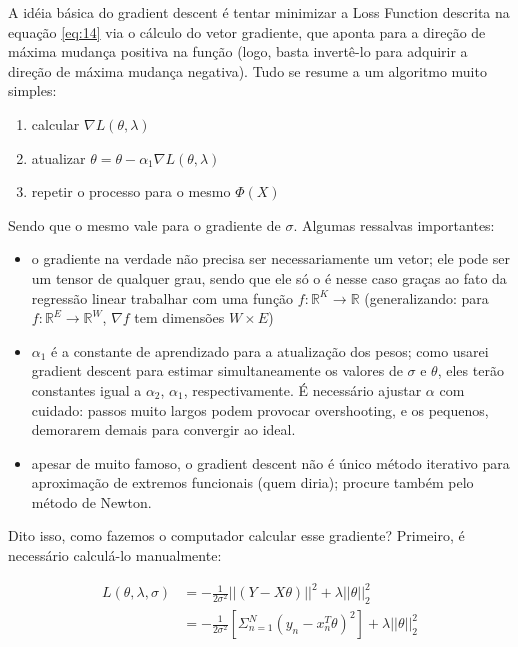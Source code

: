 \documentclass{article}
\begin{document}
A idéia básica do gradient descent é tentar minimizar a 
Loss Function descrita na equação \ref{eq:14} via o cálculo
do vetor gradiente, que aponta para a direção de máxima mudança
positiva na função (logo, basta invertê-lo para adquirir a 
direção de máxima mudança negativa). Tudo se resume a um
algoritmo muito simples:

\begin{enumerate}
    \item calcular $\nabla L(\theta,\lambda)$
    \item atualizar $\theta = \theta - \alpha_{1} 
    \nabla L(\theta,\lambda)$
    \item repetir o processo para o mesmo $\Phi(X)$
\end{enumerate}

Sendo que o mesmo vale para o gradiente de $\sigma$. 
Algumas ressalvas importantes: 

\begin{itemize}
    \item o gradiente na verdade não 
    precisa ser necessariamente um vetor; ele pode ser um tensor
    de qualquer grau, sendo que ele só o é nesse caso graças 
    ao fato da regressão linear trabalhar com uma função
    $f:\mathbb{R}^{K} \rightarrow \mathbb{R}$ (generalizando:
    para $f:\mathbb{R}^{E} \rightarrow \mathbb{R}^{W}$,
    $\nabla f$ tem dimensões $W \times E$)
    \item $\alpha_{1}$ é a constante de aprendizado para a 
    atualização dos pesos; como usarei gradient descent para
    estimar simultaneamente os valores de $\sigma$ e $\theta$,
    eles terão constantes igual a $\alpha_{2}$, $\alpha_{1}$,
    respectivamente. É necessário ajustar $\alpha$ com 
    cuidado: passos muito largos podem provocar overshooting,
    e os pequenos, demorarem demais para convergir ao ideal.
    \item apesar de muito famoso, o gradient descent não é
    único método iterativo para aproximação de extremos funcionais
    (quem diria); procure também pelo método de Newton.
\end{itemize}

Dito isso, como fazemos o computador calcular esse gradiente?
Primeiro, é necessário calculá-lo manualmente:

\begin{align}
    L(\theta, \lambda, \sigma) &= -\frac{1}{2\sigma^{2}}
    ||(Y - X\theta)||^{2} + \lambda
    ||\theta||_{2}^{2} \\
    &= -\frac{1}{2\sigma^{2}}[\Sigma_{n=1}^{N}
    (y_{n} - x_{n}^{T}\theta)^{2}] + \lambda
    ||\theta||_{2}^{2} 
\end{align}
\end{document}
